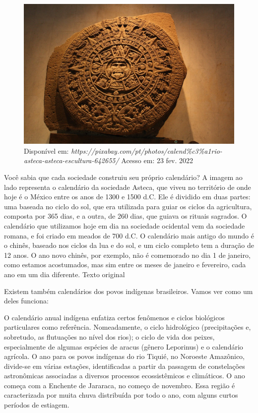 

\begin{figure}[htpb!]
\includegraphics[width=.5\textwidth]{./imgs/img32.png}
\caption{Disponível em: {\emph{https://pixabay.com/pt/photos/calend\%c3\%a1rio-asteca-asteca-escultura-642655/}} Acesso em: 23 fev. 2022}
\end{figure}

Você sabia que cada sociedade construiu seu próprio calendário? A imagem
ao lado representa o calendário da sociedade Asteca, que viveu no
território de onde hoje é o México entre os anos de 1300 e 1500 d.C. Ele
é dividido em duas partes: uma baseada no ciclo do sol, que era
utilizada para guiar os ciclos da agricultura, composta por 365 dias, e
a outra, de 260 dias, que guiava os rituais sagrados. O calendário que
utilizamos hoje em dia na sociedade ocidental vem da sociedade romana, e
foi criado em meados de 700 d.C. O calendário mais antigo do mundo é o
chinês, baseado nos ciclos da lua e do sol, e um ciclo completo tem a
duração de 12 anos. O ano novo chinês, por exemplo, não é comemorado no
dia 1 de janeiro, como estamos acostumados, mas sim entre os meses de
janeiro e fevereiro, cada ano em um dia diferente. Texto original

Existem também calendários dos povos indígenas brasileiros. Vamos ver
como um deles funciona:

O calendário anual indígena enfatiza certos fenômenos e ciclos
biológicos particulares como referência. Nomeadamente, o ciclo
hidrológico (precipitações e, sobretudo, as flutuações no nível dos
rios); o ciclo de vida dos peixes, especialmente de algumas espécies de
aracus (gênero Leporinus) e o calendário agrícola. O ano para os povos
indígenas do rio Tiquié, no Noroeste Amazônico, divide-se em várias
estações, identificadas a partir da passagem de constelações
astronômicas associadas a diversos processos ecossistêmicos e
climáticos. O ano começa com a Enchente de Jararaca, no começo de
novembro. Essa região é caracterizada por muita chuva distribuída por
todo o ano, com alguns curtos períodos de estiagem.

